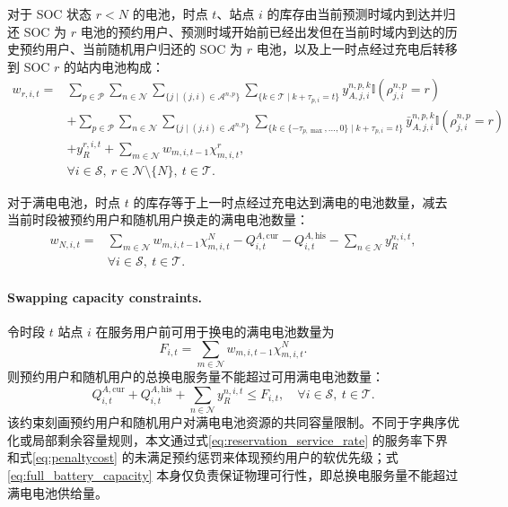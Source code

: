 \documentclass[12pt,hyperref,a4paper,UTF8]{ctexart}
\begin{document}
对于 SOC 状态 $r<N$ 的电池，时点 $t$、站点 $i$ 的库存由当前预测时域内到达并归还 SOC 为 $r$ 电池的预约用户、预测时域开始前已经出发但在当前时域内到达的历史预约用户、当前随机用户归还的 SOC 为 $r$ 电池，以及上一时点经过充电后转移到 SOC $r$ 的站内电池构成：
\begin{equation}
\begin{aligned}
w_{r,i,t}
=&
\sum_{p\in \mathcal{P}}
\sum_{n\in \mathcal{N}}
\sum_{\{j\mid (j,i)\in \mathcal{A}^{n,p}\}}
\sum_{\{k\in \mathcal{T}\mid k+\tau_{p,i}=t\}}
y_{A,j,i}^{n,p,k}
\mathbb{I}\!\left(\rho_{j,i}^{n,p}=r\right)
\\
&+
\sum_{p\in \mathcal{P}}
\sum_{n\in \mathcal{N}}
\sum_{\{j\mid (j,i)\in \mathcal{A}^{n,p}\}}
\sum_{\{k\in\{-\tau_{p,\max},\ldots,0\}\mid k+\tau_{p,i}=t\}}
\bar{y}_{A,j,i}^{n,p,k}
\mathbb{I}\!\left(\rho_{j,i}^{n,p}=r\right)
\\
&+
y_R^{r,i,t}
+
\sum_{m\in \mathcal{N}}
w_{m,i,t-1}\chi_{m,i,t}^{r},
\\
&\forall i\in \mathcal{S},\ r\in \mathcal{N}\setminus\{N\},\ t\in \mathcal{T}.
\end{aligned}
\label{eq:transition_nonfull}
\end{equation}

对于满电电池，时点 $t$ 的库存等于上一时点经过充电达到满电的电池数量，减去当前时段被预约用户和随机用户换走的满电电池数量：
\begin{equation}
\begin{aligned}
w_{N,i,t}
=&
\sum_{m\in \mathcal{N}}
w_{m,i,t-1}\chi_{m,i,t}^{N}
-
Q_{i,t}^{A,\mathrm{cur}}
-
Q_{i,t}^{A,\mathrm{his}}
-
\sum_{n\in \mathcal{N}}y_R^{n,i,t},
\\
&\forall i\in \mathcal{S},\ t\in \mathcal{T}.
\end{aligned}
\label{eq:transition_full}
\end{equation}


\paragraph{Swapping capacity constraints.}
令时段 $t$ 站点 $i$ 在服务用户前可用于换电的满电电池数量为
\begin{equation}
F_{i,t}=\sum_{m\in\mathcal{N}}w_{m,i,t-1}\chi_{m,i,t}^{N}.
\label{eq:available_full_batteries}
\end{equation}
则预约用户和随机用户的总换电服务量不能超过可用满电电池数量：
\begin{equation}
Q_{i,t}^{A,\mathrm{cur}}+Q_{i,t}^{A,\mathrm{his}}+
\sum_{n\in\mathcal{N}}y_R^{n,i,t}
\le F_{i,t},
\quad \forall i\in\mathcal{S},\ t\in\mathcal{T}.
\label{eq:full_battery_capacity}
\end{equation}
该约束刻画预约用户和随机用户对满电电池资源的共同容量限制。不同于字典序优化或局部剩余容量规则，本文通过式\eqref{eq:reservation_service_rate} 的服务率下界和式\eqref{eq:penaltycost} 的未满足预约惩罚来体现预约用户的软优先级；式\eqref{eq:full_battery_capacity} 本身仅负责保证物理可行性，即总换电服务量不能超过满电电池供给量。
\end{document}
